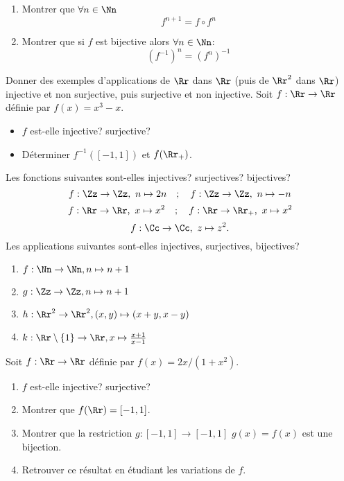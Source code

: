 \documentclass[10pt, a4paper, twocolumn]{homework}
\begin{document}
\begin{enumerate}
\item Montrer que $\forall n \in \Nn$ $$f^{n + 1} = f \circ f^n$$
\item Montrer que si $f$ est bijective alors $\forall n \in \Nn$: $$ (f^{-1})^n
 = (f^n)^{-1}$$
 \end{enumerate}
\exercice
Donner des exemples d'applications de $\Rr$ dans $\Rr$ (puis de $\Rr^{2}$ dans $\Rr$)
 injective et non surjective, puis surjective et non injective.
\exercice
Soit $f  : \Rr \rightarrow \Rr$ d\'efinie par $f(x) = x^3-x$.
\begin{itemize}
  \item $f$ est-elle injective? surjective?
  \item D\'eterminer $f^{-1}([-1,1])$ et $f(\Rr_+)$.
\end{itemize}
\exercice
Les fonctions suivantes sont-elles injectives? surjectives? bijectives?
$$ f : \Zz\rightarrow\Zz, \ n\mapsto 2n \quad ; \quad f : \Zz\rightarrow\Zz ,\ n\mapsto -n $$
$$ f:\Rr\rightarrow\Rr ,\ x\mapsto x^2 \quad ; \quad f : \Rr\rightarrow\Rr_+ ,\ x\mapsto x^2 $$
$$   f : \Cc\rightarrow\Cc ,\ z\mapsto z^2.$$
\exercice
Les applications suivantes sont-elles injectives, surjectives, bijectives?
\begin{enumerate}
\item $f : {\Nn} \to {\Nn}, {n} \mapsto {n + 1}$
\item $g : {\Zz} \to {\Zz}, {n}\mapsto{n + 1}$
\item $h : {\Rr^2} \to {\Rr^2}, {(x, y)}\mapsto{ (x + y, x-y)}$
\item $k : {\Rr \setminus \left\{ 1\right\}} \to {\Rr}, {x}\mapsto{\frac{x + 1}{x - 1}}$
\end{enumerate}
\exercice
Soit $f  : \Rr \rightarrow \Rr$ d\'efinie par $f(x) = 2x/(1+x^2)$.
\begin{enumerate}
    \item $f$ est-elle injective? surjective?
    \item Montrer que $f(\Rr)=[-1,1]$.
    \item Montrer que la restriction $g  : [-1,1] \rightarrow [-1,1]$  $g(x) = f(x)$
est une bijection.
    \item Retrouver ce r\'esultat en \'etudiant les variations de $f$.
\end{enumerate}
\end{document}
